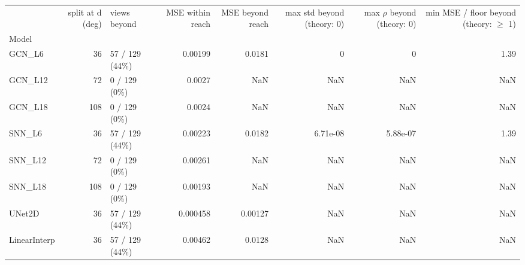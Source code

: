 \begin{tabular}{lrlrrrrr}
\toprule
 & split at d (deg) & views beyond & MSE within reach & MSE beyond reach & max std beyond (theory: 0) & max $\rho$ beyond (theory: 0) & min MSE / floor beyond (theory: $\geq$ 1) \\
Model &  &  &  &  &  &  &  \\
\midrule
GCN\_L6 & 36 & 57 / 129 (44\%) & 0.00199 & 0.0181 & 0 & 0 & 1.39 \\
GCN\_L12 & 72 & 0 / 129 (0\%) & 0.0027 & NaN & NaN & NaN & NaN \\
GCN\_L18 & 108 & 0 / 129 (0\%) & 0.0024 & NaN & NaN & NaN & NaN \\
SNN\_L6 & 36 & 57 / 129 (44\%) & 0.00223 & 0.0182 & 6.71e-08 & 5.88e-07 & 1.39 \\
SNN\_L12 & 72 & 0 / 129 (0\%) & 0.00261 & NaN & NaN & NaN & NaN \\
SNN\_L18 & 108 & 0 / 129 (0\%) & 0.00193 & NaN & NaN & NaN & NaN \\
UNet2D & 36 & 57 / 129 (44\%) & 0.000458 & 0.00127 & NaN & NaN & NaN \\
LinearInterp & 36 & 57 / 129 (44\%) & 0.00462 & 0.0128 & NaN & NaN & NaN \\
\bottomrule
\end{tabular}
